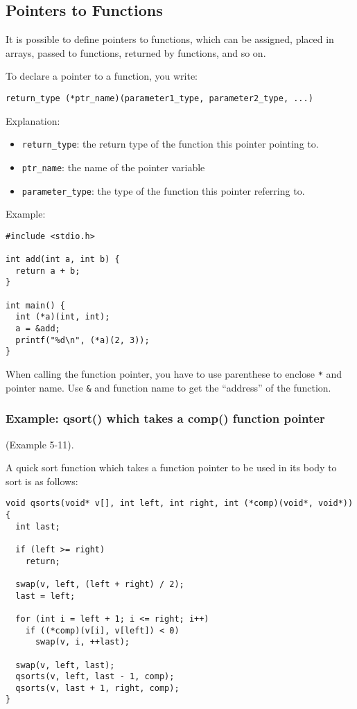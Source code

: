 \documentclass[11pt]{article}
\begin{document}
\subsection{Pointers to Functions}
\label{sec:org3800ee8}
It is possible to define pointers to functions, which can be assigned, placed in arrays, passed to functions, returned by functions, and so on.

To declare a pointer to a function, you write:
\begin{Verbatim}[frame=single]
return_type (*ptr_name)(parameter1_type, parameter2_type, ...)
\end{Verbatim}
Explanation:
\begin{itemize}
\item \texttt{return\_type}: the return type of the function this pointer pointing to.
\item \texttt{ptr\_name}: the name of the pointer variable
\item \texttt{parameter\_type}: the type of the function this pointer referring to.
\end{itemize}

Example:
\begin{verbatim}
#include <stdio.h>

int add(int a, int b) {
  return a + b;
}

int main() {
  int (*a)(int, int);
  a = &add;
  printf("%d\n", (*a)(2, 3));
}
\end{verbatim}
When calling the function pointer, you have to use parenthese to enclose \texttt{*} and pointer name. Use \texttt{\&} and function name to get the ``address'' of the function.

\subsubsection{Example: qsort() which takes a comp() function pointer}
\label{sec:org96d0f0e}
(Example 5-11).

A quick sort function which takes a function pointer to be used in its body to sort is as follows:
\begin{verbatim}
void qsorts(void* v[], int left, int right, int (*comp)(void*, void*)) {
  int last;

  if (left >= right)
    return;

  swap(v, left, (left + right) / 2);
  last = left;

  for (int i = left + 1; i <= right; i++)
    if ((*comp)(v[i], v[left]) < 0)
      swap(v, i, ++last);

  swap(v, left, last);
  qsorts(v, left, last - 1, comp);
  qsorts(v, last + 1, right, comp);
}
\end{verbatim}
\end{document}
